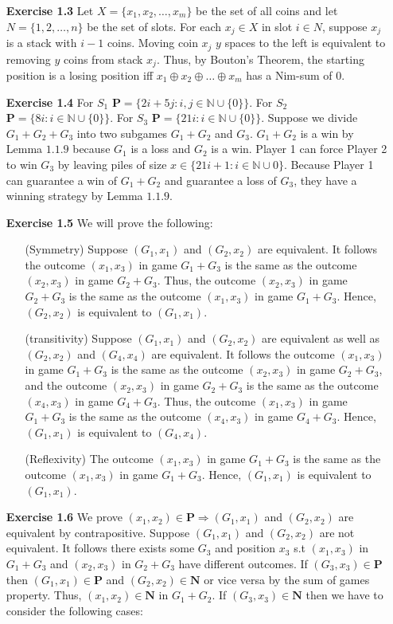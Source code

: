 \documentclass[10pt]{article}
\begin{document}
\begin{itemize}
\item [\textbf{Exercise 1.3}] Let $X=\{x_1,x_2,\ldots,x_m\}$ be the set of all coins and let $N=\{1,2,\ldots,n\}$ be the set of slots. For each $x_j\in X$ in slot $i\in N$, suppose $x_j$ is a stack with $i-1$ coins. Moving coin $x_j$ $y$ spaces to the left is equivalent to removing $y$ coins from stack $x_j$.
Thus, by Bouton's Theorem, the starting position is a losing position iff $x_1\oplus x_2\oplus\ldots\oplus x_m$ has a Nim-sum of $0$.
\item [\textbf{Exercise 1.4}] For $S_1$ $\mathbf{P}=\{2i+5j:i,j\in \mathbb{N}\cup\{0\}\}$. 
For $S_2$ $\mathbf{P}=\{8i:i\in \mathbb{N}\cup\{0\}\}$. 
For $S_3$ $\mathbf{P}=\{21i:i\in \mathbb{N}\cup\{0\}\}$. 
Suppose we divide $G_1+G_2+G_3$ into two subgames $G_1+G_2$ and $G_3$. 
$G_1+G_2$ is a win by Lemma $1.1.9$ because $G_1$ is a loss and $G_2$ is a win. 
Player 1 can force Player 2 to win $G_3$ by leaving piles of size $x\in\{21i+1:i\in\mathbb{N}\cup{0}\}$. 
Because Player 1 can guarantee a win of $G_1+G_2$ and guarantee a loss of $G_3$, they have a winning strategy by Lemma $1.1.9$. 
\item [\textbf{Exercise 1.5}] We will prove the following:\\
\begin{itemize}
    \item [(Symmetry)] Suppose $(G_1,x_1)$ and $(G_2,x_2)$ are equivalent. It follows the outcome $(x_1,x_3)$ in game $G_1+G_3$ is the same as the outcome $(x_2,x_3)$ in game $G_2+G_3$. Thus, the outcome $(x_2,x_3)$ in game $G_2+G_3$ is the same as the outcome $(x_1,x_3)$ in game $G_1+G_3$. Hence, $(G_2,x_2)$ is equivalent to $(G_1,x_1)$.
    \item [(transitivity)] Suppose $(G_1,x_1)$ and $(G_2,x_2)$ are equivalent as well as $(G_2,x_2)$ and $(G_4,x_4)$ are equivalent. It follows the outcome $(x_1,x_3)$ in game $G_1+G_3$ is the same as the outcome $(x_2,x_3)$ in game $G_2+G_3$, and the outcome $(x_2,x_3)$ in game $G_2+G_3$ is the same as the outcome $(x_4,x_3)$ in game $G_4+G_3$. Thus, the outcome $(x_1,x_3)$ in game $G_1+G_3$ is the same as the outcome $(x_4,x_3)$ in game $G_4+G_3$. Hence, $(G_1,x_1)$ is equivalent to $(G_4,x_4)$.
    \item [(Reflexivity)] The outcome $(x_1,x_3)$ in game $G_1+G_3$ is the same as the outcome $(x_1,x_3)$ in game $G_1+G_3$. Hence, $(G_1,x_1)$ is equivalent to $(G_1,x_1)$. 
\end{itemize}
\item [\textbf{Exercise 1.6}] We prove $(x_1,x_2)\in\mathbf{P}\Rightarrow (G_1,x_1)$ and $(G_2,x_2)$ are equivalent by contrapositive. Suppose $(G_1,x_1)$ and $(G_2,x_2)$ are not equivalent. It follows there exists some $G_3$ and position $x_3$ s.t $(x_1,x_3)$ in $G_1+G_3$ and $(x_2,x_3)$ in $G_2+G_3$ have different outcomes. If $(G_3,x_3)\in\mathbf{P}$ then $(G_1,x_1)\in\mathbf{P}$ and $(G_2,x_2)\in\mathbf{N}$ or vice versa by the sum of games property. Thus, $(x_1,x_2)\in\mathbf{N}$ in $G_1+G_2$. If $(G_3,x_3)\in\mathbf{N}$ then we have to consider the following cases:\par 

\end{itemize}
\end{document}
